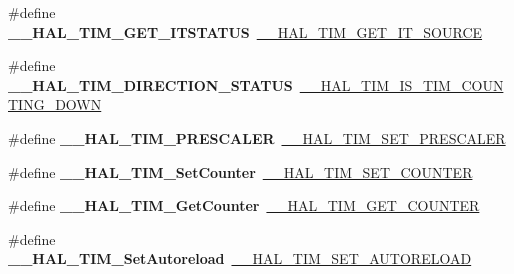 \begin{DoxyCompactItemize}
\#define {\bfseries \+\_\+\+\_\+\+H\+A\+L\+\_\+\+T\+I\+M\+\_\+\+G\+E\+T\+\_\+\+I\+T\+S\+T\+A\+T\+US}~\mbox{\hyperlink{group___t_i_m___exported___macros_ga644babf93470a6eee6bce8906c4da5c5}{\+\_\+\+\_\+\+H\+A\+L\+\_\+\+T\+I\+M\+\_\+\+G\+E\+T\+\_\+\+I\+T\+\_\+\+S\+O\+U\+R\+CE}}
\item 
\mbox{\label{group___h_a_l___t_i_m___aliased___macros_ga76886ef4a5712e8627ea09ff564cdff2}} 
\#define {\bfseries \+\_\+\+\_\+\+H\+A\+L\+\_\+\+T\+I\+M\+\_\+\+D\+I\+R\+E\+C\+T\+I\+O\+N\+\_\+\+S\+T\+A\+T\+US}~\mbox{\hyperlink{group___t_i_m___exported___macros_gac73f5e7669d92971830481e7298e98ba}{\+\_\+\+\_\+\+H\+A\+L\+\_\+\+T\+I\+M\+\_\+\+I\+S\+\_\+\+T\+I\+M\+\_\+\+C\+O\+U\+N\+T\+I\+N\+G\+\_\+\+D\+O\+WN}}
\item 
\mbox{\label{group___h_a_l___t_i_m___aliased___macros_ga64fdbe2a68fc8459071ee0dcb9096e34}} 
\#define {\bfseries \+\_\+\+\_\+\+H\+A\+L\+\_\+\+T\+I\+M\+\_\+\+P\+R\+E\+S\+C\+A\+L\+ER}~\mbox{\hyperlink{group___t_i_m___exported___macros_gafdc5a06eab07e0c24e729fd492bdb27c}{\+\_\+\+\_\+\+H\+A\+L\+\_\+\+T\+I\+M\+\_\+\+S\+E\+T\+\_\+\+P\+R\+E\+S\+C\+A\+L\+ER}}
\item 
\mbox{\label{group___h_a_l___t_i_m___aliased___macros_ga23ef14334077dc01d9e6d8bfa6614260}} 
\#define {\bfseries \+\_\+\+\_\+\+H\+A\+L\+\_\+\+T\+I\+M\+\_\+\+Set\+Counter}~\mbox{\hyperlink{group___t_i_m___exported___macros_ga9746ac75e4cd25cec1a9ebac8cb82b97}{\+\_\+\+\_\+\+H\+A\+L\+\_\+\+T\+I\+M\+\_\+\+S\+E\+T\+\_\+\+C\+O\+U\+N\+T\+ER}}
\item 
\mbox{\label{group___h_a_l___t_i_m___aliased___macros_ga074ff6af2efe776a0e76622bf8d4c85a}} 
\#define {\bfseries \+\_\+\+\_\+\+H\+A\+L\+\_\+\+T\+I\+M\+\_\+\+Get\+Counter}~\mbox{\hyperlink{group___t_i_m___exported___macros_gaf1af08014b9d06efbbb091d58d47c8ba}{\+\_\+\+\_\+\+H\+A\+L\+\_\+\+T\+I\+M\+\_\+\+G\+E\+T\+\_\+\+C\+O\+U\+N\+T\+ER}}
\item 
\mbox{\label{group___h_a_l___t_i_m___aliased___macros_ga8857297381807be432e6b6eb98fdb591}} 
\#define {\bfseries \+\_\+\+\_\+\+H\+A\+L\+\_\+\+T\+I\+M\+\_\+\+Set\+Autoreload}~\mbox{\hyperlink{group___t_i_m___exported___macros_ga1e6300cab1e34ecaaf490dc7d4812d69}{\+\_\+\+\_\+\+H\+A\+L\+\_\+\+T\+I\+M\+\_\+\+S\+E\+T\+\_\+\+A\+U\+T\+O\+R\+E\+L\+O\+AD}}

\end{DoxyCompactItemize}
